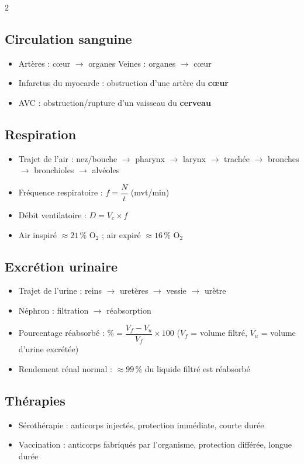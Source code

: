 \begin{multicols}{2}
\subsection*{\color{onbo}Circulation sanguine}
\begin{itemize}
\item Artères : cœur $\to$ organes \quad Veines : organes $\to$ cœur
\item Infarctus du myocarde : obstruction d'une artère du \textbf{cœur}
\item AVC : obstruction/rupture d'un vaisseau du \textbf{cerveau}
\end{itemize}

\subsection*{\color{onbo}Respiration}
\begin{itemize}
\item Trajet de l'air : nez/bouche $\to$ pharynx $\to$ larynx $\to$ trachée $\to$
bronches $\to$ bronchioles $\to$ alvéoles
\item Fréquence respiratoire : $f=\dfrac Nt$ (mvt/min)
\item Débit ventilatoire : $D=V_c\times f$
\item Air inspiré $\approx21\,\%$ $\mathrm{O_2}$ ; air expiré $\approx16\,\%$
$\mathrm{O_2}$
\end{itemize}

\subsection*{\color{onbo}Excrétion urinaire}
\begin{itemize}
\item Trajet de l'urine : reins $\to$ uretères $\to$ vessie $\to$ urètre
\item Néphron : filtration $\to$ réabsorption
\item Pourcentage réabsorbé : $\%=\dfrac{V_f-V_u}{V_f}\times100$ ($V_f$ = volume
filtré, $V_u$ = volume d'urine excrétée)
\item Rendement rénal normal : $\approx99\,\%$ du liquide filtré est réabsorbé
\end{itemize}

\subsection*{\color{onbo}Thérapies}
\begin{itemize}
\item Sérothérapie : anticorps injectés, protection immédiate, courte durée
\item Vaccination : anticorps fabriqués par l'organisme, protection différée,
longue durée
\end{itemize}


\end{multicols}
